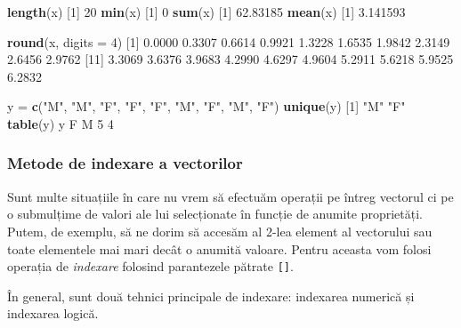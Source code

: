 \documentclass[]{article}
\newenvironment{Shaded}{\begin{snugshade}}{\end{snugshade}}
\newcommand{\KeywordTok}[1]{\textcolor[rgb]{0.13,0.29,0.53}{\textbf{#1}}}
\newcommand{\DataTypeTok}[1]{\textcolor[rgb]{0.13,0.29,0.53}{#1}}
\newcommand{\DecValTok}[1]{\textcolor[rgb]{0.00,0.00,0.81}{#1}}
\newcommand{\FloatTok}[1]{\textcolor[rgb]{0.00,0.00,0.81}{#1}}
\newcommand{\StringTok}[1]{\textcolor[rgb]{0.31,0.60,0.02}{#1}}
\newcommand{\NormalTok}[1]{#1}
\begin{document}
\begin{Shaded}
\begin{Highlighting}[]
\KeywordTok{length}\NormalTok{(x)}
\NormalTok{[}\DecValTok{1}\NormalTok{] }\DecValTok{20}
\KeywordTok{min}\NormalTok{(x)}
\NormalTok{[}\DecValTok{1}\NormalTok{] }\DecValTok{0}
\KeywordTok{sum}\NormalTok{(x)}
\NormalTok{[}\DecValTok{1}\NormalTok{] }\FloatTok{62.83185}
\KeywordTok{mean}\NormalTok{(x)}
\NormalTok{[}\DecValTok{1}\NormalTok{] }\FloatTok{3.141593}

\KeywordTok{round}\NormalTok{(x, }\DataTypeTok{digits =} \DecValTok{4}\NormalTok{)}
\NormalTok{ [}\DecValTok{1}\NormalTok{] }\FloatTok{0.0000} \FloatTok{0.3307} \FloatTok{0.6614} \FloatTok{0.9921} \FloatTok{1.3228} \FloatTok{1.6535} \FloatTok{1.9842} \FloatTok{2.3149} \FloatTok{2.6456} \FloatTok{2.9762}
\NormalTok{[}\DecValTok{11}\NormalTok{] }\FloatTok{3.3069} \FloatTok{3.6376} \FloatTok{3.9683} \FloatTok{4.2990} \FloatTok{4.6297} \FloatTok{4.9604} \FloatTok{5.2911} \FloatTok{5.6218} \FloatTok{5.9525} \FloatTok{6.2832}

\NormalTok{y =}\StringTok{  }\KeywordTok{c}\NormalTok{(}\StringTok{"M"}\NormalTok{, }\StringTok{"M"}\NormalTok{, }\StringTok{"F"}\NormalTok{, }\StringTok{"F"}\NormalTok{, }\StringTok{"F"}\NormalTok{, }\StringTok{"M"}\NormalTok{, }\StringTok{"F"}\NormalTok{, }\StringTok{"M"}\NormalTok{, }\StringTok{"F"}\NormalTok{)}
\KeywordTok{unique}\NormalTok{(y)}
\NormalTok{[}\DecValTok{1}\NormalTok{] }\StringTok{"M"} \StringTok{"F"}
\KeywordTok{table}\NormalTok{(y)}
\NormalTok{y}
\NormalTok{F M }
\DecValTok{5} \DecValTok{4} 
\end{Highlighting}
\end{Shaded}

\subsubsection{Metode de indexare a
vectorilor}\label{metode-de-indexare-a-vectorilor}

Sunt multe situațiile în care nu vrem să efectuăm operații pe întreg
vectorul ci pe o submulțime de valori ale lui selecționate în funcție de
anumite proprietăți. Putem, de exemplu, să ne dorim să accesăm al 2-lea
element al vectorului sau toate elementele mai mari decât o anumită
valoare. Pentru aceasta vom folosi operația de \emph{indexare} folosind
parantezele pătrate \texttt{{[}{]}}.

În general, sunt două tehnici principale de indexare: indexarea numerică
și indexarea logică.
\end{document}
